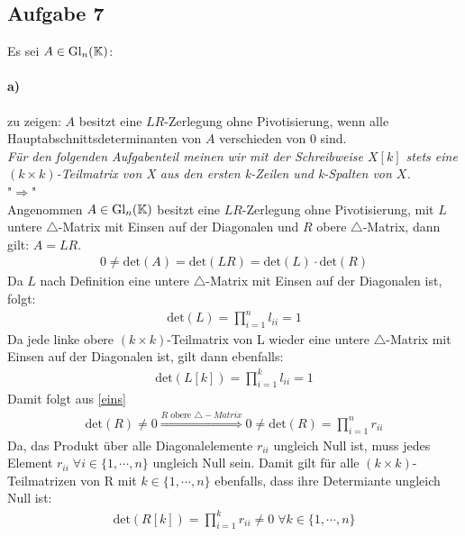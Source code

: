 \subsection*{Aufgabe 7}
Es sei $A \in \mathrm{Gl}_n (\mathbb K)$: 
\paragraph*{a)}
zu zeigen: $A$ besitzt eine $LR$-Zerlegung ohne Pivotisierung, wenn alle Hauptabschnittsdeterminanten von $A$ verschieden von 0 sind.\\
\newline
\textit{F\"ur den folgenden Aufgabenteil meinen wir mit der Schreibweise $X[k]$ stets eine $(k \times k)$-Teilmatrix von X aus den ersten k-Zeilen und k-Spalten von $X$.\\}
\newline
"$\Rightarrow$"\\
Angenommen $A \in \mathrm{Gl}_n (\mathbb K)$ besitzt eine $LR$-Zerlegung ohne Pivotisierung, mit $L$ untere $\triangle$-Matrix mit Einsen auf der Diagonalen und $R$ obere $\triangle$-Matrix, dann gilt:
\textit{} $A=LR$.
\begin{align}\label{eins}
0 \neq \mathrm{det}(A) = \mathrm{det}(LR) = \mathrm{det}(L)\cdot \mathrm{det}(R)
\end{align}
Da $L$ nach Definition eine untere $\triangle$-Matrix mit Einsen auf der Diagonalen ist, folgt:
\begin{align}
\mathrm{det}(L)=\prod_{i=1}^{n} l_{ii}=1
\end{align} 
Da jede linke obere $(k \times k)$-Teilmatrix von L wieder eine untere $\triangle$-Matrix mit Einsen auf der Diagonalen ist, gilt dann ebenfalls:
\begin{align}\label{drei}
\mathrm{det}(L[k])=\prod_{i=1}^{k} l_{ii}=1
\end{align}
Damit folgt aus \eqref{eins}
\begin{align}
\mathrm{det}(R) \neq 0 \overset{R\text{ obere }\triangle-Matrix}{\Rightarrow} 0 \neq \mathrm{det}(R)=\prod_{i=1}^{n} r_{ii}
\end{align}
Da, das Produkt \"uber alle Diagonalelemente $r_{ii}$ ungleich Null ist, muss jedes Element  $r_{ii} \; \forall i \in\{1,\cdots,n\}$ ungleich Null sein. Damit gilt f\"ur alle $(k \times k)$-Teilmatrizen von R mit  $k \in\{1,\cdots,n\}$ ebenfalls, dass ihre Determiante ungleich Null ist:
\begin{align}\label{fuenf}
\mathrm{det}(R[k])= \prod_{i=1}^{k} r_{ii} \neq 0 \; \forall k \in\{1,\cdots,n\}
\end{align} 
